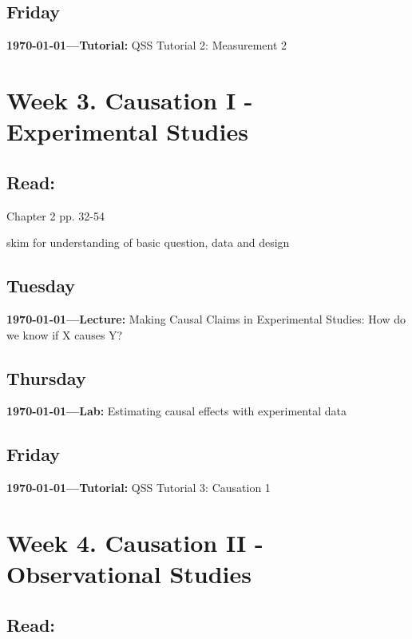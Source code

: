 \subsection{Friday} \textbf{\today---Tutorial:} QSS Tutorial 2: Measurement 2
\AdvanceDate[4]



\vspace{2em}



\section{Week 3. Causation I - Experimental Studies}

\subsection{Read:}

\citet{Imai2022-pm} Chapter 2 pp. 32-54

\citet{Broockman2016} skim for understanding of basic question, data and design



\subsection{Tuesday} \textbf{\today---Lecture:}  Making Causal Claims in Experimental Studies: How do we know if X causes Y?
\AdvanceDate[2]

\subsection{Thursday} \textbf{\today---Lab:} Estimating causal effects with experimental data
\AdvanceDate[1]
\subsection{Friday} \textbf{\today---Tutorial:} QSS Tutorial 3: Causation 1
\AdvanceDate[4]


\vspace{2em}

\section{Week 4. Causation II - Observational Studies}

\subsection{Read:}

